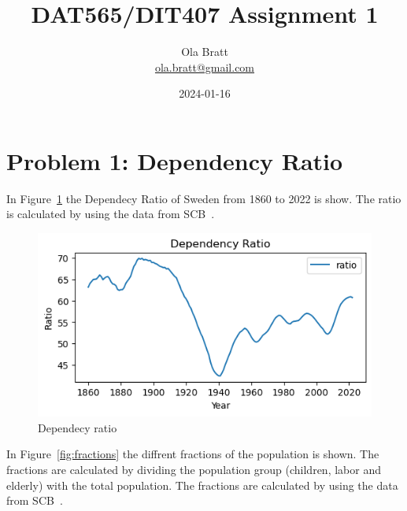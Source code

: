 \documentclass[a4paper]{article}
\begin{document}
\author{Ola Bratt \\
  \href{mailto:ola.bratt@gmail.com}{ola.bratt@gmail.com}
}
\title{DAT565/DIT407 Assignment 1}
\date{2024-01-16}

\maketitle



\section*{Problem 1: Dependency Ratio}

In Figure~\ref{fig:ratio} the Dependecy Ratio of Sweden from 1860 to 2022 is show.
The ratio is calculated by using the data from SCB~\cite{SCB:2023}.



\begin{figure}[h]
  \begin{center}
    \includegraphics[width=\textwidth]{ratio.png}
    \caption{Dependecy ratio}
    \label{fig:ratio}
  \end{center}
\end{figure}

\newpage

In Figure~\ref{fig:fractions} the diffrent fractions of the population is shown. The fractions 
are calculated by dividing the population group (children, labor and elderly) with the total population. 
The fractions are calculated by using the data from SCB~\cite{SCB:2023}.
\end{document}
